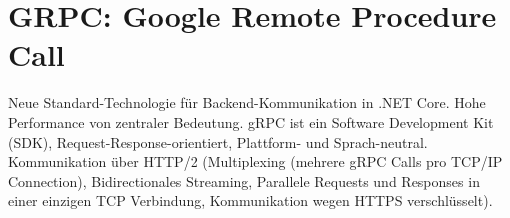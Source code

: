 \documentclass[
a4paper,
oneside,
10pt,
fleqn,
headsepline,
toc=listofnumbered, 
bibliography=totocnumbered]{scrartcl}
\let\stdsection\section
\renewcommand\section{\clearpage\stdsection}
\begin{document}



 




\section{GRPC: Google Remote Procedure Call}
Neue Standard-Technologie für Backend-Kommunikation in .NET Core. Hohe Performance von zentraler Bedeutung. gRPC ist ein Software Development Kit (SDK), Request-Response-orientiert, Plattform- und Sprach-neutral. Kommunikation über HTTP/2 (Multiplexing (mehrere gRPC Calls pro TCP/IP Connection), Bidirectionales Streaming, Parallele Requests und Responses in einer einzigen TCP Verbindung, Kommunikation wegen HTTPS verschlüsselt).
\end{document}
